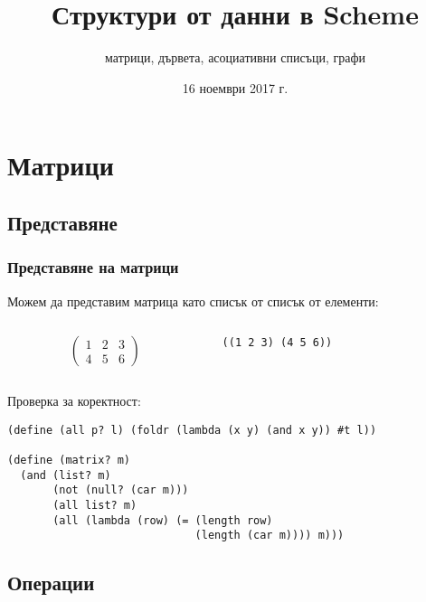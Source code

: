 \documentclass{beamer}
\title{Структури от данни в Scheme}
\subtitle{матрици, дървета, асоциативни списъци, графи}
\date{16 ноември 2017 г.}
\begin{document}
\begin{frame}
  \titlepage
\end{frame}

\section{Матрици}

\subsection{Представяне}

\begin{frame}[fragile]
  \frametitle{Представяне на матрици}
  Можем да представим матрица като списък от списък от елементи:\\
  \begin{columns}[T,onlytextwidth]
    \begin{column}{0.5\textwidth}
      \begin{equation*}
        \left(
          \begin{array}{ccc}
            1 & 2 & 3\\
            4 & 5 & 6
          \end{array}
        \right)
      \end{equation*}
    \end{column}
    \begin{column}{0.5\textwidth}
      \vspace{1em}
      \tt{((1 2 3) (4 5 6))}
    \end{column}
  \end{columns}
  \vspace{1em}
  \pause
  Проверка за коректност:
  \pause
\begin{lstlisting}
(define (all p? l) (foldr (lambda (x y) (and x y)) #t l))

(define (matrix? m)
  (and (list? m)
       (not (null? (car m)))
       (all list? m)
       (all (lambda (row) (= (length row)
                             (length (car m)))) m)))
\end{lstlisting}
\end{frame}

\subsection{Операции}
\end{document}

